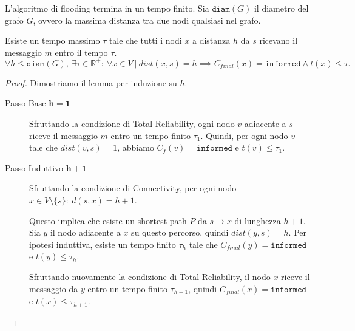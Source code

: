 \begin{lemma}
L'algoritmo di flooding termina in un tempo finito. Sia $\texttt{diam}(G)$ il diametro del grafo $G$, ovvero la massima distanza tra due nodi qualsiasi nel grafo. 

Esiste un tempo massimo $\tau$ tale che tutti i nodi $x$ a distanza $h$ da $s$ ricevano il messaggio $m$ entro il tempo $\tau$.
\[
    \forall h \leq \texttt{diam}(G),\ \exists \tau \in \mathbb{R}^{+}:\ \forall x \in V\ |\ dist(x,s) = h \implies C_{final}(x) = \texttt{informed} \land t(x) \leq \tau.
\]

\begin{proof}
Dimostriamo il lemma per induzione su $h$.
\begin{description}
    \item[Passo Base $\mathbf{h = 1}$] Sfruttando la condizione di Total Reliability, ogni nodo $v$ adiacente a $s$ riceve il messaggio $m$ entro un tempo finito $\tau_1$. Quindi, per ogni nodo $v$ tale che $dist(v, s) = 1$, abbiamo $C_f(v) = \texttt{informed}$ e $t(v) \leq \tau_1$.
    \item[Passo Induttivo $\mathbf{h + 1}$] Sfruttando la condizione di Connectivity, per ogni nodo $x \in V \setminus \{s\}:\ d(s, x) = h + 1$. 
    
    Questo implica che esiste un shortest path $P$ da $s \to x$ di lunghezza $h + 1$. Sia $y$ il nodo adiacente a $x$ su questo percorso, quindi $dist(y, s) = h$. Per ipotesi induttiva, esiste un tempo finito $\tau_h$ tale che $C_{final}(y) = \texttt{informed}$ e $t(y) \leq \tau_h$. 
    
    Sfruttando nuovamente la condizione di Total Reliability, il nodo $x$ riceve il messaggio da $y$ entro un tempo finito $\tau_{h+1}$, quindi $C_{final}(x) = \texttt{informed}$ e $t(x) \leq \tau_{h+1}$.
\end{description}
\end{proof}

\end{lemma}

